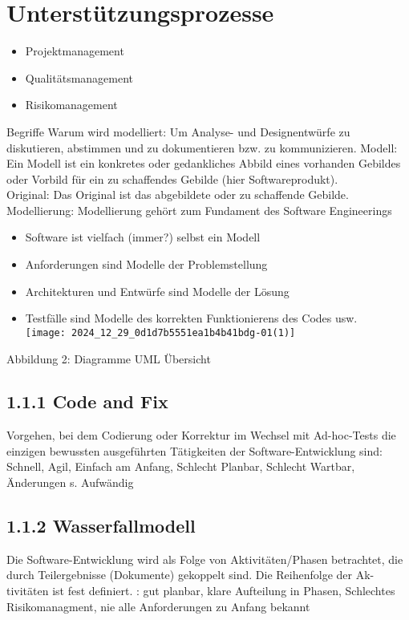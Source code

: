 \section*{Unterstützungsprozesse}
\begin{itemize}
  \item Projektmanagement
  \item Qualitätsmanagement
  \item Risikomanagement
\end{itemize}

Begriffe Warum wird modelliert: Um Analyse- und Designentwürfe zu diskutieren, abstimmen und zu dokumentieren bzw. zu kommunizieren. Modell: Ein Modell ist ein konkretes oder gedankliches Abbild eines vorhanden Gebildes oder Vorbild für ein zu schaffendes Gebilde (hier Softwareprodukt).\\
Original: Das Original ist das abgebildete oder zu schaffende Gebilde.\\
Modellierung: Modellierung gehört zum Fundament des Software Engineerings

\begin{itemize}
  \item Software ist vielfach (immer?) selbst ein Modell
  \item Anforderungen sind Modelle der Problemstellung
  \item Architekturen und Entwürfe sind Modelle der Lösung
  \item Testfälle sind Modelle des korrekten Funktionierens des Codes usw.\\
\texttt{[image: 2024\_12\_29\_0d1d7b5551ea1b4b41bdg-01(1)]}
\end{itemize}

Abbildung 2: Diagramme UML Übersicht

\subsection*{1.1.1 Code and Fix}
Vorgehen, bei dem Codierung oder Korrektur im Wechsel mit Ad-hoc-Tests die einzigen bewussten ausgeführten Tätigkeiten der Software-Entwicklung sind: Schnell, Agil, Einfach am Anfang, Schlecht Planbar, Schlecht Wartbar, Änderungen s. Aufwändig

\subsection*{1.1.2 Wasserfallmodell}
Die Software-Entwicklung wird als Folge von Aktivitäten/Phasen betrachtet, die durch Teilergebnisse (Dokumente) gekoppelt sind. Die Reihenfolge der Ak-\\
tivitäten ist fest definiert. : gut planbar, klare Aufteilung in Phasen, Schlechtes Risikomanagment, nie alle Anforderungen zu Anfang bekannt

